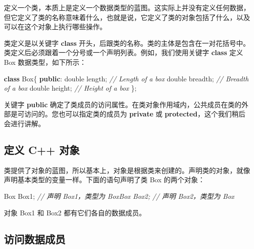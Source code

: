 \documentclass[
]{article}
\newenvironment{Shaded}{}{}
\newcommand{\CommentTok}[1]{\textcolor[rgb]{0.38,0.63,0.69}{\textit{#1}}}
\newcommand{\DataTypeTok}[1]{\textcolor[rgb]{0.56,0.13,0.00}{#1}}
\newcommand{\KeywordTok}[1]{\textcolor[rgb]{0.00,0.44,0.13}{\textbf{#1}}}
\newcommand{\NormalTok}[1]{#1}
\newcommand{\OperatorTok}[1]{\textcolor[rgb]{0.40,0.40,0.40}{#1}}
\begin{document}
定义一个类，本质上是定义一个数据类型的蓝图。这实际上并没有定义任何数据，但它定义了类的名称意味着什么，也就是说，它定义了类的对象包括了什么，以及可以在这个对象上执行哪些操作。

类定义是以关键字 \textbf{class}
开头，后跟类的名称。类的主体是包含在一对花括号中。类定义后必须跟着一个分号或一个声明列表。例如，我们使用关键字
\textbf{class} 定义 Box 数据类型，如下所示：

\begin{Shaded}
\begin{Highlighting}[]
\KeywordTok{class}\NormalTok{ Box}\OperatorTok{\{}
\KeywordTok{public}\OperatorTok{:}      
   \DataTypeTok{double}\NormalTok{ length}\OperatorTok{;}   \CommentTok{// Length of a box      }
   \DataTypeTok{double}\NormalTok{ breadth}\OperatorTok{;}  \CommentTok{// Breadth of a box      }
   \DataTypeTok{double}\NormalTok{ height}\OperatorTok{;}   \CommentTok{// Height of a box}
\OperatorTok{\};}
\end{Highlighting}
\end{Shaded}

关键字 \textbf{public}
确定了类成员的访问属性。在类对象作用域内，公共成员在类的外部是可访问的。您也可以指定类的成员为
\textbf{private} 或 \textbf{protected}，这个我们稍后会进行讲解。

\hypertarget{ux5b9aux4e49-c-ux5bf9ux8c61}{%
\subsection{定义 C++ 对象}\label{ux5b9aux4e49-c-ux5bf9ux8c61}}

类提供了对象的蓝图，所以基本上，对象是根据类来创建的。声明类的对象，就像声明基本类型的变量一样。下面的语句声明了类
Box 的两个对象：

\begin{Shaded}
\begin{Highlighting}[]
\NormalTok{Box Box1}\OperatorTok{;}          \CommentTok{// 声明 Box1，类型为 BoxBox Box2;          // 声明 Box2，类型为 Box}
\end{Highlighting}
\end{Shaded}

对象 Box1 和 Box2 都有它们各自的数据成员。

\hypertarget{ux8bbfux95eeux6570ux636eux6210ux5458}{%
\subsection{访问数据成员}\label{ux8bbfux95eeux6570ux636eux6210ux5458}}
\end{document}
